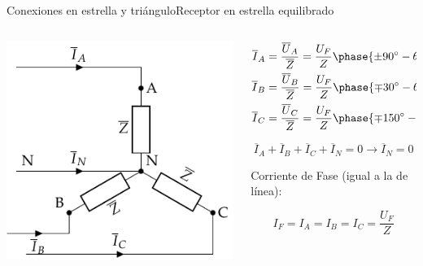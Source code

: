 \documentclass[aspectratio=169, xcolor={usenames,svgnames,dvipsnames}]{beamer}
\begin{document}
\begin{frame}{Conexiones en estrella y triángulo}{Receptor en estrella equilibrado}
\begin{columns}
\begin{column}{0.5\columnwidth}
\begin{center}
\includegraphics[width=.9\linewidth]{../figs/EstrellaEquilibrado_Receptor.pdf}
\end{center}
\end{column}

\begin{column}{0.5\columnwidth}
\begin{align*}
  \overline{I}_A &= \frac{\overline{U}_A}{\overline{Z}} = \frac{U_F}{Z}\phase{\ang{\pm 90} - \theta} \\
  \overline{I}_B &= \frac{\overline{U}_B}{\overline{Z}} = \frac{U_F}{Z}\phase{\ang{\mp 30} - \theta}\\
  \overline{I}_C &= \frac{\overline{U}_C}{\overline{Z}} = \frac{U_F}{Z}\phase{\ang{\mp 150} - \theta}
\end{align*}

\[
  \overline{I}_A  + \overline{I}_B + \overline{I}_C + \overline{I}_N = 0 \rightarrow \boxed{\overline{I}_N = 0}
\]

Corriente de Fase (\alert{igual a la de línea}):

\[
  \boxed{I_F={I}_A = {I}_B = {I}_C = \frac{U_F}{Z}}
\]

\end{column}
\end{columns}
\end{frame}
\end{document}
